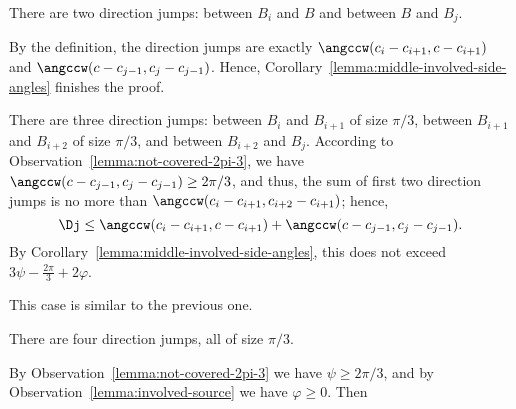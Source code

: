 \begin{enumerate}[label={\bf Case \arabic*: }, wide, labelwidth=!, labelindent=0pt]

There are two direction jumps: between $B_i$ and $B$ and between $B$ and $B_j$.

By the definition, the direction jumps are exactly $\angccw(c_i - c_{i+1}, c - c_{i+1})$ and $\angccw(c - c_{j-1}, c_j - c_{j-1})$. Hence, Corollary~\ref{lemma:middle-involved-side-angles} finishes the proof.


There are three direction jumps: between $B_i$ and $B_{i+1}$ of size $\pi/3$, between $B_{i+1}$ and $B_{i+2}$ of size $\pi/3$, and between $B_{i+2}$ and $B_j$. According to Observation~\ref{lemma:not-covered-2pi-3}, we have $\angccw(c - c_{j-1}, c_j - c_{j-1})\geq2\pi/3$, and thus, the sum of first two direction jumps is no more than $\angccw(c_i - c_{i+1}, c_{i+2} - c_{i+1})$; hence,
$$\Dj\leq \angccw(c_i - c_{i+1}, c - c_{i+1}) + \angccw(c - c_{j-1}, c_j - c_{j-1}).$$
By Corollary~\ref{lemma:middle-involved-side-angles}, this does not exceed $3\psi - \frac{2\pi}{3} + 2\varphi$.



This case is similar to the previous one.


There are four direction jumps, all of size $\pi/3$. %

By Observation~\ref{lemma:not-covered-2pi-3} we have $\psi\geq2\pi/3$, and by Observation~\ref{lemma:involved-source} we have $\varphi\geq 0$. Then


\end{enumerate}
